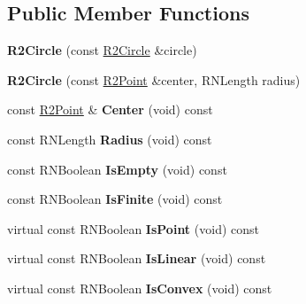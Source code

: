 \subsection*{Public Member Functions}
\begin{DoxyCompactItemize}
\item 
{\bfseries R2\+Circle} (const \hyperlink{class_r2_circle}{R2\+Circle} \&circle)\hypertarget{class_r2_circle_aea0db03ef12498517373e3055508ec28}{}\label{class_r2_circle_aea0db03ef12498517373e3055508ec28}

\item 
{\bfseries R2\+Circle} (const \hyperlink{class_r2_point}{R2\+Point} \&center, R\+N\+Length radius)\hypertarget{class_r2_circle_add167bbe2a0b2148fddc8c64ff6b73ac}{}\label{class_r2_circle_add167bbe2a0b2148fddc8c64ff6b73ac}

\item 
const \hyperlink{class_r2_point}{R2\+Point} \& {\bfseries Center} (void) const \hypertarget{class_r2_circle_a212da76d0f1b2c51bbf04c6575e05b69}{}\label{class_r2_circle_a212da76d0f1b2c51bbf04c6575e05b69}

\item 
const R\+N\+Length {\bfseries Radius} (void) const \hypertarget{class_r2_circle_a62bbdb92ebf2276142f614eeed3e810c}{}\label{class_r2_circle_a62bbdb92ebf2276142f614eeed3e810c}

\item 
const R\+N\+Boolean {\bfseries Is\+Empty} (void) const \hypertarget{class_r2_circle_a7cf7bc2d585a58e73d268b40d7f9f83d}{}\label{class_r2_circle_a7cf7bc2d585a58e73d268b40d7f9f83d}

\item 
const R\+N\+Boolean {\bfseries Is\+Finite} (void) const \hypertarget{class_r2_circle_a721f4fda5e568f79ab20599d652a808c}{}\label{class_r2_circle_a721f4fda5e568f79ab20599d652a808c}

\item 
virtual const R\+N\+Boolean {\bfseries Is\+Point} (void) const \hypertarget{class_r2_circle_a6b275abb91731350b3e67181f7c0fd5c}{}\label{class_r2_circle_a6b275abb91731350b3e67181f7c0fd5c}

\item 
virtual const R\+N\+Boolean {\bfseries Is\+Linear} (void) const \hypertarget{class_r2_circle_ab85cdf400f17507a42c22c59fb9a48fd}{}\label{class_r2_circle_ab85cdf400f17507a42c22c59fb9a48fd}

\item 
virtual const R\+N\+Boolean {\bfseries Is\+Convex} (void) const \hypertarget{class_r2_circle_a08118538e962843ce1bbe18ad765abcf}{}\label{class_r2_circle_a08118538e962843ce1bbe18ad765abcf}


\end{DoxyCompactItemize}
